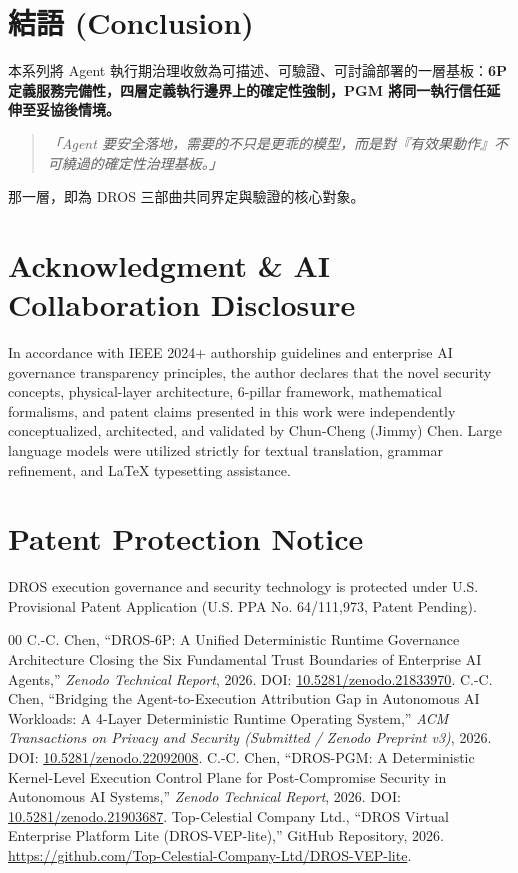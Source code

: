 \documentclass[conference]{IEEEtran}
\begin{document}
\section{結語 (Conclusion)}
本系列將 Agent 執行期治理收斂為可描述、可驗證、可討論部署的一層基板：\textbf{6P 定義服務完備性，四層定義執行邊界上的確定性強制，PGM 將同一執行信任延伸至妥協後情境。}

\begin{quote}
\textit{「Agent 要安全落地，需要的不只是更乖的模型，而是對『有效果動作』不可繞過的確定性治理基板。」}
\end{quote}
那一層，即為 DROS 三部曲共同界定與驗證的核心對象。

\section*{Acknowledgment \& AI Collaboration Disclosure}
In accordance with IEEE 2024+ authorship guidelines and enterprise AI governance transparency principles, the author declares that the novel security concepts, physical-layer architecture, 6-pillar framework, mathematical formalisms, and patent claims presented in this work were independently conceptualized, architected, and validated by Chun-Cheng (Jimmy) Chen. Large language models were utilized strictly for textual translation, grammar refinement, and LaTeX typesetting assistance.

\section*{Patent Protection Notice}
DROS execution governance and security technology is protected under U.S. Provisional Patent Application (U.S. PPA No. 64/111,973, Patent Pending).


\begin{thebibliography}{00}
 C.-C. Chen, ``DROS-6P: A Unified Deterministic Runtime Governance Architecture Closing the Six Fundamental Trust Boundaries of Enterprise AI Agents,'' \textit{Zenodo Technical Report}, 2026. DOI: \href{https://doi.org/10.5281/zenodo.21833970}{10.5281/zenodo.21833970}.
 C.-C. Chen, ``Bridging the Agent-to-Execution Attribution Gap in Autonomous AI Workloads: A 4-Layer Deterministic Runtime Operating System,'' \textit{ACM Transactions on Privacy and Security (Submitted / Zenodo Preprint v3)}, 2026. DOI: \href{https://doi.org/10.5281/zenodo.22092008}{10.5281/zenodo.22092008}.
 C.-C. Chen, ``DROS-PGM: A Deterministic Kernel-Level Execution Control Plane for Post-Compromise Security in Autonomous AI Systems,'' \textit{Zenodo Technical Report}, 2026. DOI: \href{https://doi.org/10.5281/zenodo.21903687}{10.5281/zenodo.21903687}.
 Top-Celestial Company Ltd., ``DROS Virtual Enterprise Platform Lite (DROS-VEP-lite),'' GitHub Repository, 2026. \url{https://github.com/Top-Celestial-Company-Ltd/DROS-VEP-lite}.
\end{thebibliography}
\end{document}
